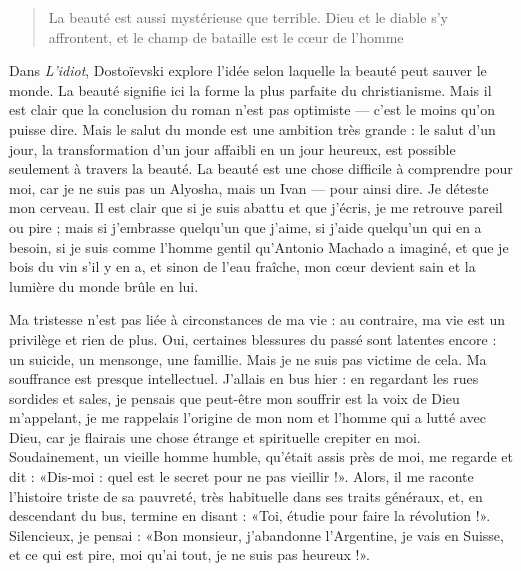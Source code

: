 \documentclass[a4paper, 12pt]{article}
\begin{document}
\begin{quote} La beauté est aussi mystérieuse que terrible. Dieu et le diable
s'y affrontent, et le champ de bataille est le cœur de l'homme \end{quote}

Dans \textit{L'idiot}, Dostoïevski explore l'idée selon laquelle la beauté peut
sauver le monde. La beauté signifie ici la forme la plus parfaite du
christianisme. Mais il est clair que la conclusion du roman n'est pas optimiste
--- c'est le moins qu'on puisse dire. Mais le salut du monde est une ambition
très grande : le salut d'un jour, la transformation d'un jour affaibli en un
jour heureux, est possible seulement à travers la beauté. La beauté est une
chose difficile à comprendre pour moi, car je ne suis pas un Alyosha, mais un
Ivan --- pour ainsi dire. Je déteste mon cerveau. Il est clair que si je suis
abattu et que j'écris, je me retrouve pareil ou pire ; mais si j'embrasse
quelqu'un que j'aime, si j'aide quelqu'un qui en a besoin, si je suis comme
l'homme gentil qu'Antonio Machado a imaginé, et que je bois du vin s'il y en a,
et sinon de l'eau fraîche, mon cœur devient sain et la lumière du monde brûle en
lui.

Ma tristesse n'est pas liée à circonstances de ma vie : au contraire, ma vie est
un privilège et rien de plus. Oui, certaines blessures du passé sont latentes
encore : un suicide, un mensonge, une famillie. Mais je ne suis pas victime de
cela. Ma souffrance est presque intellectuel. J'allais en bus hier : en
regardant les rues sordides et sales, je pensais que peut-être mon souffrir est
la voix de Dieu m'appelant, je me rappelais l'origine de mon nom et l'homme qui
a lutté avec Dieu, car je flairais une chose étrange et spirituelle crepiter en
moi. Soudainement, un vieille homme humble, qu'était assis près de moi, me
regarde et dit : «Dis-moi : quel est le secret pour ne pas vieillir !». Alors,
il me raconte l'histoire triste de sa pauvreté, très habituelle dans ses traits
généraux, et, en descendant du bus, termine en disant : «Toi, étudie pour faire
la révolution !». Silencieux, je pensai : «Bon monsieur, j'abandonne
l'Argentine, je vais en Suisse, et ce qui est pire, moi qu'ai tout, je ne suis
pas heureux !».  
\end{document}
